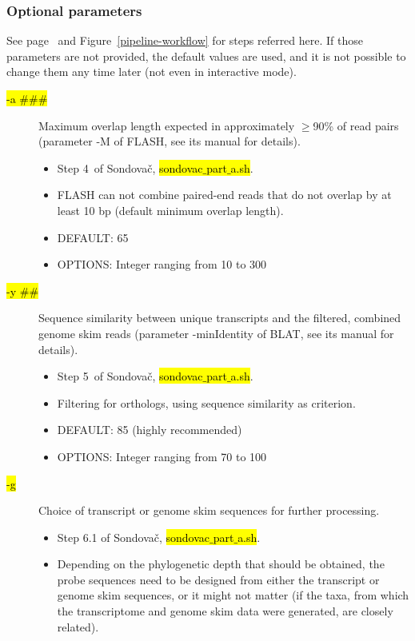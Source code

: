 \documentclass[a4paper, 11pt, twoside]{article}
\renewcommand{\texttt}[1]{\hl{\ttfamily #1}}
\begin{document}
\subsubsection{Optional parameters}

See page~\pageref{pipeline-overview} and Figure~\ref{pipeline-workflow} for steps referred here. If those parameters are not provided, the default values are used, and it is not possible to change them any time later (not even in interactive mode).

\begin{description}
\item[\texttt{-a \#\#\#}] Maximum overlap length expected in approximately $\geq$90\% of read pairs (parameter -M of FLASH, see its manual for details).
  \begin{itemize}
    \item Step 4~of Sondovač, \texttt{sondovac$\_$part$\_$a.sh}.
    \item FLASH can not combine paired-end reads that do not overlap by at least 10 bp (default minimum overlap length).
    \item DEFAULT: 65
    \item OPTIONS: Integer ranging from 10 to 300
  \end{itemize}
\item[\texttt{-y \#\#}] Sequence similarity between unique transcripts and the filtered, combined genome skim reads (parameter -minIdentity of BLAT, see its manual for details).
  \begin{itemize}
    \item Step 5~of Sondovač, \texttt{sondovac$\_$part$\_$a.sh}.
    \item Filtering for orthologs, using sequence similarity as criterion.
    \item DEFAULT: 85 (highly recommended)
    \item OPTIONS: Integer ranging from 70 to 100
  \end{itemize}
\item[\texttt{-g}] Choice of transcript or genome skim sequences for further processing.
  \begin{itemize}
    \item Step 6.1 of Sondovač, \texttt{sondovac$\_$part$\_$a.sh}.
    \item Depending on the phylogenetic depth that should be obtained, the probe sequences need to be designed from either the transcript or genome skim sequences, or it might not matter (if the taxa, from which the transcriptome and genome skim data were generated, are closely related).

\end{itemize}
\end{description}
\end{document}
